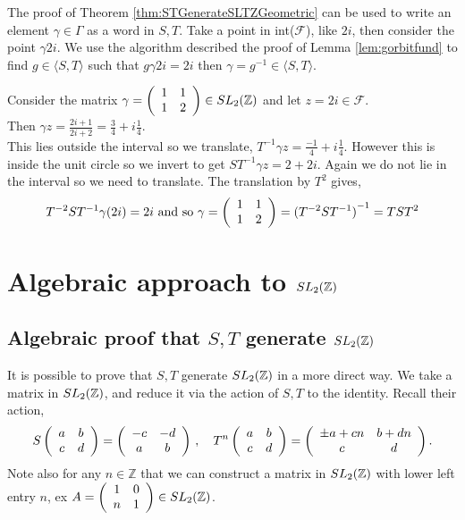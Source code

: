 The proof of Theorem \ref{thm:STGenerateSLTZGeometric} can be used to write an element $\gamma \in \Gamma$ as a word in $S, T$. Take a point in int($\mathcal{F}$), like $2i$, then consider the point $\gamma 2i$. We use the algorithm described the proof of Lemma \ref{lem:gorbitfund} to find $g \in \langle S, T \rangle$ such that $g \gamma 2i = 2i$ then $\gamma = g^{-1} \in \langle S, T \rangle$. 
\begin{example}
Consider the matrix $ \gamma = \left(\begin{array}{ c c }  1 & 1 \\ 1 & 2 \end{array} \right) \in SL_2(\mathbb{Z})$ and let $z = 2i \in \mathcal{F}$.
\\
Then $\gamma z = \frac{2i +1}{2i +2} = \frac{3}{4} + i\frac{1}{4}$.
\\
This lies outside the interval so we translate, $T^{-1}\gamma z = \frac{-1}{4} + i\frac{1}{4}$. However this is inside the unit circle so we invert to get $ST^{-1}\gamma z = 2 + 2i$. Again we do not lie in the interval so we need to translate. The translation by $T^2$ gives, 
$$T^{-2}ST^{-1}\gamma (2i) = 2i \text{ and so } \gamma = \left(\begin{array}{ c c }  1 & 1 \\ 1 & 2 \end{array} \right) = {(T^{-2}ST^{-1})}^{-1} = TST^2$$
\end{example}


\section{Algebraic approach to $SL_2(\mathbb{Z})$}

\subsection{Algebraic proof that $S,T$ generate $SL_2(\mathbb{Z})$ }
\label{subsect:proofAlgebraicSTGenerate}
It is possible to prove that $S, T$ generate $SL_2(\mathbb{Z})$ in a more direct way. We take a matrix in $SL_2(\mathbb{Z})$, and reduce it via the action of $S,T$ to the identity. Recall their action, 
$$S\left(\begin{array}{ c c } a & b \\ c & d \end{array} \right) = \left(\begin{array}{ c c }  -c & -d \\ a & b \end{array} \right)\,,\quad 
T^n\left(\begin{array}{ c c } a & b \\ c & d \end{array} \right) = \left(\begin{array}{ c c }  \pm a +cn & b+dn \\ c & d \end{array} \right).$$
Note also for any $n \in \mathbb{Z}$ that we can construct a matrix in $SL_2(\mathbb{Z})$ with lower left entry $n$, ex $A = \left(\begin{array}{ c c }  1 & 0 \\ n & 1 \end{array} \right) \in SL_2(\mathbb{Z})$.\\

